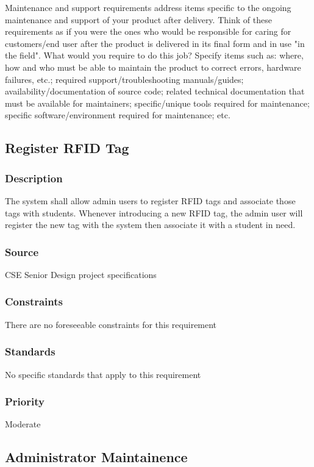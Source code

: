 \quad \quad Maintenance and support 
requirements address items specific to the ongoing maintenance and support of your 
product after delivery. Think of these requirements as if you were the ones who would 
be responsible for caring for customers/end user after the product is delivered in its 
final form and in use "in the field". What would you require to do this job? Specify 
items such as: where, how and who must be able to maintain the product to correct 
errors, hardware failures, etc.; required support/troubleshooting manuals/guides; 
availability/documentation of source code; related technical documentation that must 
be available for maintainers; specific/unique tools required for maintenance; 
specific software/environment required for maintenance; etc.

\subsection{Register RFID Tag}
\subsubsection{Description}
\quad \quad The system shall allow admin users to register RFID tags and associate those tags 
with students. Whenever introducing a new RFID tag, the admin user will register the 
new tag with the system then associate it with a student in need.
\subsubsection{Source}
\quad \quad CSE Senior Design project specifications
\subsubsection{Constraints}
\quad \quad There are no foreseeable constraints for this requirement  
\subsubsection{Standards}
\quad \quad No specific standards that apply to this requirement
\subsubsection{Priority}
\quad \quad Moderate

\subsection{Administrator Maintainence}
